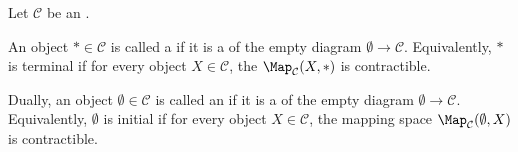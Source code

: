 \begin{definition} \label{definition:terminal_object_in_an_infty_category}
    Let $\mathcal{C}$ be an .

    An object $* \in \mathcal{C}$ is called a  if it is a  of the empty diagram $\emptyset \to \mathcal{C}$. Equivalently, $*$ is terminal if for every object $X \in \mathcal{C}$, the  $\Map_{\mathcal{C}}(X, *)$ is contractible.

    Dually, an object $\emptyset \in \mathcal{C}$ is called an  if it is a  of the empty diagram $\emptyset \to \mathcal{C}$. Equivalently, $\emptyset$ is initial if for every object $X \in \mathcal{C}$, the mapping space $\Map_{\mathcal{C}}(\emptyset, X)$ is contractible.
\end{definition}
